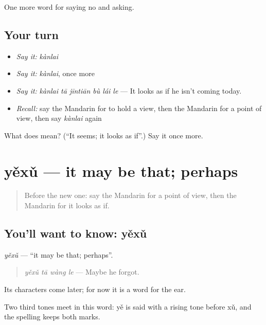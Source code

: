 \begin{grammarlens}[title={What you've built}]
One more word for saying no and asking.
\end{grammarlens}

\subsection*{Your turn}
\begin{itemize}
\raggedright
  \item \emph{Say it:} \emph{kànlai}
  \item \emph{Say it:} \emph{kànlai}, once more
  \item \emph{Say it:} \emph{kànlai tā jīntiān bù lái le} — It looks as if he isn't coming today.
  \item \emph{Recall:} say the Mandarin for to hold a view, then the Mandarin for a point of view, then say \emph{kànlai} again
\end{itemize}

\begin{tcolorbox}[breakable,colback=teal!4,colframe=teal!35!black,title={Before you move on}]
What does  mean? (\textquotedblleft{}It seems; it looks as if\textquotedblright{}.) Say it once more.
\end{tcolorbox}
\section[yěxǔ]{yěxǔ — it may be that; perhaps}

\label{lesson:ZH-C256-yexu}



\begin{quote}
Before the new one: say the Mandarin for a point of view, then the Mandarin for it looks as if.
\end{quote}

\subsection*{You'll want to know: yěxǔ}
\emph{yěxǔ} — \textquotedblleft{}it may be that; perhaps\textquotedblright{}.

\begin{quote}
\emph{yěxǔ tā wàng le} — Maybe he forgot.
\end{quote}

Its characters come later; for now it is a word for the ear.

Two third tones meet in this word: yě is said with a rising tone before xǔ, and the spelling keeps both marks.

